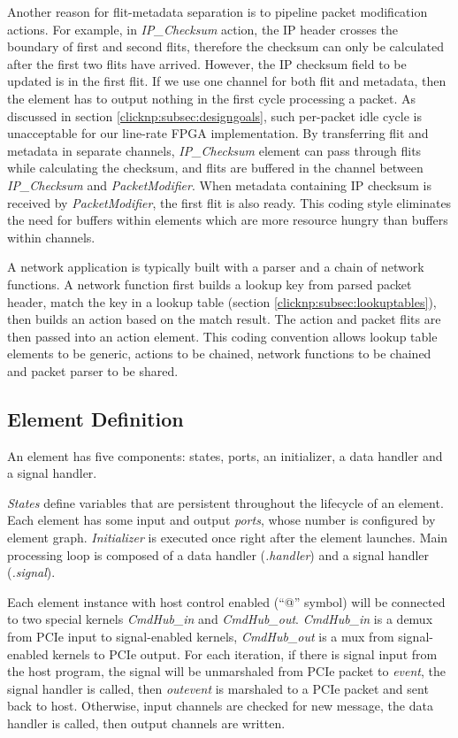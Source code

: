 Another reason for flit-metadata separation is to pipeline packet modification actions. For example, in \textit{IP\_Checksum} action, the IP header crosses the boundary of first and second flits, therefore the checksum can only be calculated after the first two flits have arrived. However, the IP checksum field to be updated is in the first flit. If we use one channel for both flit and metadata, then the element has to output nothing in the first cycle processing a packet. As discussed in section \ref{clicknp:subsec:designgoals}, such per-packet idle cycle is unacceptable for our line-rate FPGA implementation. By transferring flit and metadata in separate channels, \textit{IP\_Checksum} element can pass through flits while calculating the checksum, and flits are buffered in the channel between \textit{IP\_Checksum} and \textit{PacketModifier}. When metadata containing IP checksum is received by \textit{PacketModifier}, the first flit is also ready. This coding style eliminates the need for buffers within elements which are more resource hungry than buffers within channels.

A network application is typically built with a parser and a chain of network functions. A network function first builds a lookup key from parsed packet header, match the key in a lookup table (section \ref{clicknp:subsec:lookuptables}), then builds an action based on the match result. The action and packet flits are then passed into an action element. This coding convention allows lookup table elements to be generic, actions to be chained, network functions to be chained and packet parser to be shared.

\subsection{Element Definition}
\label{clicknp:subsec:elementdef}

An element has five components: states, ports, an initializer, a data handler and a signal handler.

\textit{States} define variables that are persistent throughout the lifecycle of an element. Each element has some input and output \textit{ports}, whose number is configured by element graph. \textit{Initializer} is executed once right after the element launches. Main processing loop is composed of a data handler (\textit{.handler}) and a signal handler (\textit{.signal}).

Each element instance with host control enabled (``@'' symbol) will be connected to two special kernels \textit{CmdHub\_in} and \textit{CmdHub\_out}. \textit{CmdHub\_in} is a demux from PCIe input to signal-enabled kernels, \textit{CmdHub\_out} is a mux from signal-enabled kernels to PCIe output. For each iteration, if there is signal input from the host program, the signal will be unmarshaled from PCIe packet to \textit{event}, the signal handler is called, then \textit{outevent} is marshaled to a PCIe packet and sent back to host. Otherwise, input channels are checked for new message, the data handler is called, then output channels are written.

